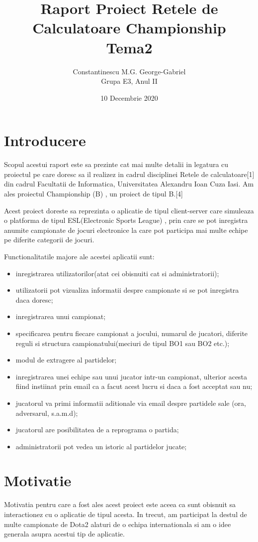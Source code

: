 \documentclass{article}
\title{Raport Proiect Retele de Calculatoare  Championship \\ Tema2}
\author{Constantinescu M.G. George-Gabriel \\
Grupa E3, Anul II}
\date{10 Decembrie 2020}
\begin{document}
\maketitle

\section{Introducere}

\quad Scopul acestui raport este  sa prezinte cat mai multe detalii in legatura cu proiectul pe care doresc sa il realizez in cadrul disciplinei Retele de calculatoare[1] din cadrul Facultatii de Informatica, Universitatea Alexandru Ioan Cuza Iasi. Am ales proiectul Championship (B) , un proiect de tipul B.[4]

Acest proiect doreste sa reprezinta o aplicatie de tipul client-server care simuleaza o platforma de tipul ESL(Electronic Sports League) , prin care se pot inregistra anumite campionate de jocuri electronice la care pot participa mai multe echipe pe diferite categorii de jocuri.

Functionalitatile majore ale acestei aplicatii sunt: 
\begin{itemize}
    \item inregistrarea utilizatorilor(atat cei obisnuiti cat si administratorii);
    \item utilizatorii pot vizualiza informatii despre campionate si se pot inregistra daca doresc;
    \item inregistrarea unui campionat;
    \item specificarea pentru fiecare campionat a jocului, numarul de jucatori, diferite reguli si structura campionatului(meciuri de tipul BO1 sau BO2 etc.);
    \item modul de extragere al partidelor;
    \item inregistrarea unei echipe sau unui jucator intr-un campionat, ulterior acesta fiind instiinat prin email ca a facut acest lucru si daca a fost acceptat sau nu;
    \item jucatorul va primi informatii aditionale via email despre partidele sale (ora, adversarul, s.a.m.d);
    \item jucatorul are posibilitatea de a reprograma o partida;
    \item administratorii pot vedea un istoric al partidelor jucate;
\end{itemize}

\section{Motivatie}
\quad Motivatia pentru care a fost ales acest proiect este aceea ca sunt obisnuit sa interactionez cu o aplicatie de tipul acesta. In trecut, am participat la destul de multe campionate de Dota2 alaturi de o echipa internationala si am o idee generala asupra acestui tip de aplicatie. 
\end{document}
